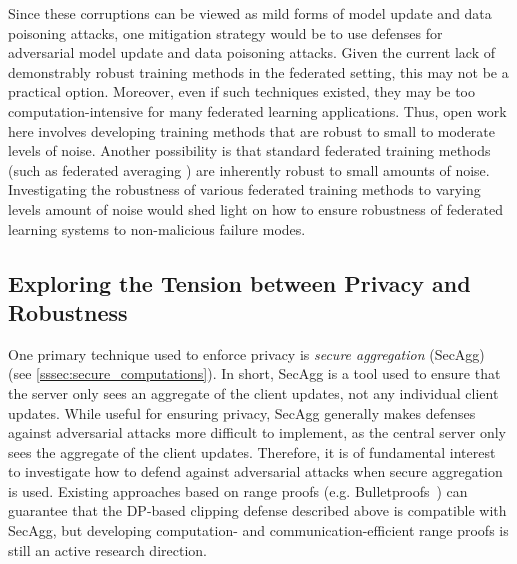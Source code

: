 \documentclass[11pt]{article}
\newcommand{\sketch}[1]{[{\color{darkgreen}{\emph{#1}}}]}
\begin{document}
Since these corruptions can be viewed as mild forms of model update and data poisoning attacks, one mitigation strategy would be to use defenses for adversarial model update and data poisoning attacks. Given the current lack of demonstrably robust training methods in the federated setting, this may not be a practical option. Moreover, even if such techniques existed, they may be too computation-intensive for many federated learning applications. Thus, open work here involves developing training methods that are robust to small to moderate levels of noise. Another possibility is that standard federated training methods (such as federated averaging \citep{mcmahan17fedavg}) are inherently robust to small amounts of noise. Investigating the robustness of various federated training methods to varying levels amount of noise would shed light on how to ensure robustness of federated learning systems to non-malicious failure modes.


\subsection{Exploring the Tension between Privacy and Robustness}
\label{subsec:tension_privacy_robustness}


One primary technique used to enforce privacy is \emph{secure aggregation} (SecAgg) (see \ref{sssec:secure_computations}). In short, SecAgg is a tool used to ensure that the server only sees an aggregate of the client updates, not any individual client updates. While useful for ensuring privacy, SecAgg generally makes defenses against adversarial attacks more difficult to implement, as the central server only sees the aggregate of the client updates. Therefore, it is of fundamental interest to investigate how to defend against adversarial attacks when secure aggregation is used. Existing approaches based on range proofs (e.g. Bulletproofs~\citep{DBLP:conf/sp/BunzBBPWM18}) can guarantee that the DP-based clipping defense described above is compatible with SecAgg, but developing computation- and communication-efficient range proofs is still an active research direction.
\end{document}
